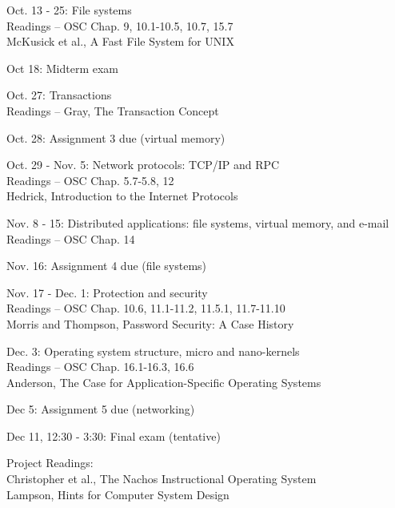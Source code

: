 \begin{description}
\item{Oct. 13 - 25:} File systems\\
  Readings -- OSC Chap. 9, 10.1-10.5, 10.7, 15.7 \\
  McKusick et al., A Fast File System for UNIX

\item{Oct 18:} Midterm exam

\item{Oct. 27:} Transactions\\
  Readings -- Gray, The Transaction Concept

\item{Oct. 28:} Assignment 3 due (virtual memory)

\item{Oct. 29 - Nov. 5:} Network protocols: TCP/IP and RPC\\
  Readings -- OSC Chap. 5.7-5.8, 12\\
  Hedrick, Introduction to the Internet Protocols

\item{Nov. 8 - 15:} Distributed applications: file systems, virtual memory, and e-mail\\
  Readings -- OSC Chap. 14

\item{Nov. 16:} Assignment 4 due (file systems)

\item{Nov. 17 - Dec. 1:} Protection and security\\
  Readings -- OSC Chap. 10.6, 11.1-11.2, 11.5.1, 11.7-11.10\\
  Morris and Thompson, Password Security: A Case History

\item{Dec. 3:} Operating system structure, micro and nano-kernels\\
  Readings -- OSC Chap. 16.1-16.3, 16.6\\
  Anderson, The Case for Application-Specific Operating Systems

\item{Dec 5:} Assignment 5 due (networking)

\item{Dec 11, 12:30 - 3:30:} Final exam (tentative)

\item{Project Readings:}\\
  Christopher et al., The Nachos Instructional Operating System\\
  Lampson, Hints for Computer System Design

\end{description}


